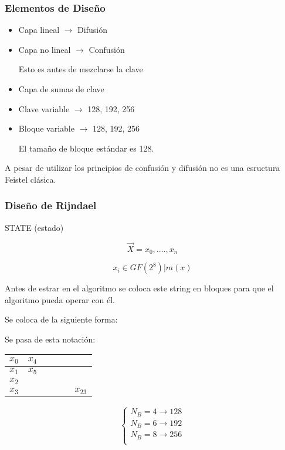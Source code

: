 \subsubsection{Elementos de Diseño}

\begin{itemize}
	\item Capa lineal $\rightarrow$ Difusión
	\item Capa no lineal $\rightarrow$ Confusión
	
	Esto es antes de mezclarse la clave
	\item Capa de sumas de clave
	\item Clave variable $\rightarrow$ 128, 192, 256
	\item Bloque variable $\rightarrow$ 128, 192, 256
	
	El tamaño de bloque estándar es 128.
\end{itemize}

A pesar de utilizar los principios de confusión y difusión no es una esructura Feistel clásica.
 
\subsubsection{Diseño de Rijndael}

STATE (estado)

$$\overrightarrow{X} = x_0 , ...., x_n$$

$$x_i \in GF(2^8)|m(x)$$

Antes de estrar en el algoritmo se coloca este string en bloques para que el algoritmo pueda operar con él.

Se coloca de la siguiente forma:

Se pasa de esta notación:

	\begin{center}
		\begin{tabular}{l | l | c | r | r | r}
			$x_0$ & $x_4$ &  &  &  &  \\
			\hline
			$x_1$  & $x_5$ &  &  &  &  \\
			\hline
			$x_2$  &  &  &  &  &  \\
			\hline
			$x_3$ &  &  &  &  & $x_23$ \\
		\end{tabular}
	\end{center}
	
	$$\begin{cases}
	N_B = 4 \rightarrow 128\\
	N_B = 6 \rightarrow 192\\
	N_B = 8 \rightarrow 256\\
	\end{cases}$$


